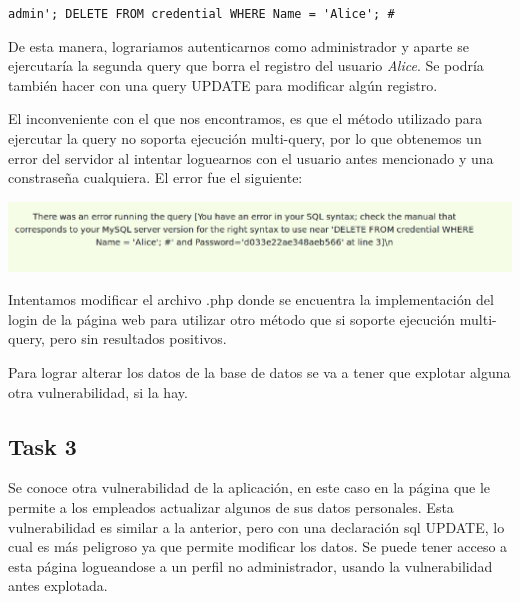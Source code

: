 \documentclass[11pt]{article}
\begin{document}
\verb|admin'; DELETE FROM credential WHERE Name = 'Alice'; #|

De esta manera, lograriamos autenticarnos como administrador y aparte se ejercutaría la segunda query que borra el 
registro del usuario \textit{Alice}. Se podría también hacer con una query UPDATE para modificar algún registro.

El inconveniente con el que nos encontramos, es que el método utilizado para ejercutar la query no soporta ejecución
multi-query, por lo que obtenemos un error del servidor al intentar loguearnos con el usuario antes mencionado y 
una constraseña cualquiera. El error fue el siguiente:
\begin{center}
    \includegraphics[scale=.45]{task2_3_sql.png}
\end{center}

Intentamos modificar el archivo .php donde se encuentra la implementación del login de la página web para utilizar 
otro método que si soporte ejecución multi-query, pero sin resultados positivos.

Para lograr alterar los datos de la base de datos se va a tener que explotar alguna otra vulnerabilidad, si la hay.

\subsection*{Task 3}
Se conoce otra vulnerabilidad de la aplicación, en este caso en la página que le permite a los empleados actualizar 
algunos de sus datos personales. Esta vulnerabilidad es similar a la anterior, pero con una declaración sql UPDATE,
lo cual es más peligroso ya que permite modificar los datos. Se puede tener acceso a esta página logueandose a un perfil
no administrador, usando la vulnerabilidad antes explotada.
\end{document}

